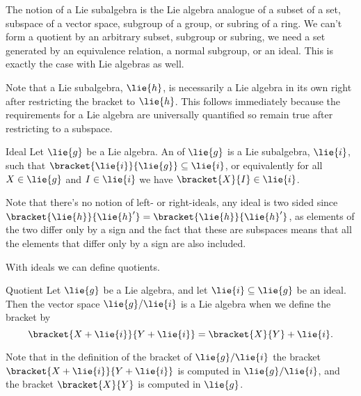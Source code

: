 \documentclass[fleqn]{NotesClass}
\begin{document}
    The notion of a Lie subalgebra is the Lie algebra analogue of a subset of a set, subspace of a vector space, subgroup of a group, or subring of a ring.
    We can't form a quotient by an arbitrary subset, subgroup or subring, we need a set generated by an equivalence relation, a normal subgroup, or an ideal.
    This is exactly the case with Lie algebras as well.
    
    Note that a Lie subalgebra, \(\lie{h}\), is necessarily a Lie algebra in its own right after restricting the bracket to \(\lie{h}\).
    This follows immediately because the requirements for a Lie algebra are universally quantified so remain true after restricting to a subspace.
    
    \begin{dfn}{Ideal}{}
        Let \(\lie{g}\) be a Lie algebra.
        An  of \(\lie{g}\) is a Lie subalgebra, \(\lie{i}\), such that \(\bracket{\lie{i}}{\lie{g}} \subseteq \lie{i}\), or equivalently for all \(X \in \lie{g}\) and \(I \in \lie{i}\) we have \(\bracket{X}{I} \in \lie{i}\).
    \end{dfn}
    
    Note that there's no notion of left- or right-ideals, any ideal is two sided since \(\bracket{\lie{h}}{\lie{h}'} = \bracket{\lie{h}}{\lie{h}'}\), as elements of the two differ only by a sign and the fact that these are subspaces means that all the elements that differ only by a sign are also included.
    
    With ideals we can define quotients.
    
    \begin{dfn}{Quotient}{}
        Let \(\lie{g}\) be a Lie algebra, and let \(\lie{i} \subseteq \lie{g}\) be an ideal.
        Then the  vector space \(\lie{g}/\lie{i}\) is a Lie algebra when we define the bracket by
        \begin{equation}
            \bracket{X + \lie{i}}{Y + \lie{i}} = \bracket{X}{Y} + \lie{i}.
        \end{equation}
    \end{dfn}
    
    Note that in the definition of the bracket of \(\lie{g}/\lie{i}\) the bracket \(\bracket{X + \lie{i}}{Y + \lie{i}}\) is computed in \(\lie{g}/\lie{i}\), and the bracket \(\bracket{X}{Y}\) is computed in \(\lie{g}\).
    
\end{document}
